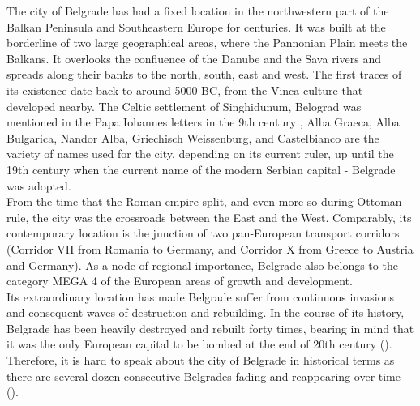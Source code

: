 \documentclass[11pt]{report}
\begin{document}
The city of Belgrade has had a fixed location in the northwestern part of the Balkan Peninsula and Southeastern Europe for centuries. It was built at the borderline of two large geographical areas, where the Pannonian Plain meets the Balkans. It overlooks the confluence of the Danube and the Sava rivers and spreads along their banks to the north, south, east and west. The first traces of its existence date back to around 5000 BC, from the Vinca culture that developed nearby. The Celtic settlement of Singhidunum, Belograd was mentioned in the Papa Iohannes letters in the 9th century , Alba Graeca, Alba Bulgarica, Nandor Alba, Griechisch Weissenburg, and Castelbianco are the variety of names used for the city, depending on its current ruler, up until the 19th century when the current name of the modern Serbian capital - Belgrade was adopted. 
\\

From the time that the Roman empire split, and even more so during Ottoman rule, the city was the crossroads between the East and the West. Comparably, its contemporary location is the junction of two pan-European transport corridors (Corridor VII from Romania to Germany, and Corridor X from Greece to Austria and Germany). As a node of regional importance, Belgrade also belongs to the category MEGA 4 of the European areas of growth and development.
\\

Its extraordinary location has made Belgrade suffer from continuous invasions and consequent waves of destruction and rebuilding. In the course of its history, Belgrade has been heavily destroyed and rebuilt forty times, bearing in mind that it was the only European capital to be bombed at the end of 20th century (\href{Doytchinov}{\citealt{doytchinov_belgrade_2015}}). Therefore, it is hard to speak about the city of Belgrade in historical terms as there are several dozen consecutive Belgrades fading and reappearing over time (\href{Grozdanic}{\citealt{grozdanic_belgrade_2008}}).
\\
\end{document}
